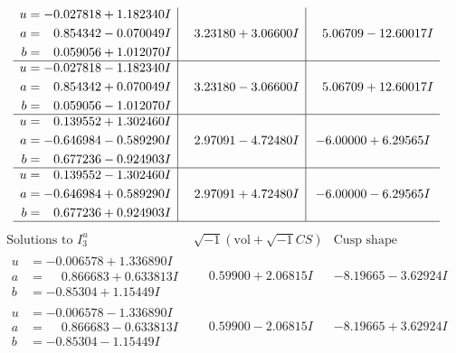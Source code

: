 \documentclass[1p]{elsarticle_modified}
\theoremstyle{definition}
\newcommand{\I}{\sqrt{-1}}
\begin{document}
$$\begin{array}{c|c|c}
\begin{aligned}
u &= -0.027818 + 1.182340 I \\
a &= \phantom{-}0.854342 - 0.070049 I \\
b &= \phantom{-}0.059056 + 1.012070 I\end{aligned}
 & \phantom{-}3.23180 + 3.06600 I & \phantom{-}5.06709 - 12.60017 I \\ \hline\begin{aligned}
u &= -0.027818 - 1.182340 I \\
a &= \phantom{-}0.854342 + 0.070049 I \\
b &= \phantom{-}0.059056 - 1.012070 I\end{aligned}
 & \phantom{-}3.23180 - 3.06600 I & \phantom{-}5.06709 + 12.60017 I \\ \hline\begin{aligned}
u &= \phantom{-}0.139552 + 1.302460 I \\
a &= -0.646984 - 0.589290 I \\
b &= \phantom{-}0.677236 - 0.924903 I\end{aligned}
 & \phantom{-}2.97091 - 4.72480 I & -6.00000 + 6.29565 I \\ \hline\begin{aligned}
u &= \phantom{-}0.139552 - 1.302460 I \\
a &= -0.646984 + 0.589290 I \\
b &= \phantom{-}0.677236 + 0.924903 I\end{aligned}
 & \phantom{-}2.97091 + 4.72480 I & -6.00000 - 6.29565 I\\
 \hline 
 \end{array}$$\newpage$$\begin{array}{c|c|c}  
\text{Solutions to }I^u_{3}& \I (\text{vol} + \sqrt{-1}CS) & \text{Cusp shape}\\
 \hline 
\begin{aligned}
u &= -0.006578 + 1.336890 I \\
a &= \phantom{-}0.866683 + 0.633813 I \\
b &= -0.85304 + 1.15449 I\end{aligned}
 & \phantom{-}0.59900 + 2.06815 I & -8.19665 - 3.62924 I \\ \hline\begin{aligned}
u &= -0.006578 - 1.336890 I \\
a &= \phantom{-}0.866683 - 0.633813 I \\
b &= -0.85304 - 1.15449 I\end{aligned}
 & \phantom{-}0.59900 - 2.06815 I & -8.19665 + 3.62924 I \\ \hline\begin{aligned}

\end{aligned}
\end{array}$$
\end{document}

